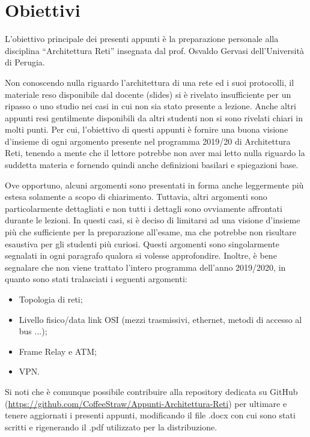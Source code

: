 
\section*{Obiettivi}
    L’obiettivo principale dei presenti appunti è la preparazione personale alla disciplina
    “Architettura Reti” insegnata dal prof. Osvaldo Gervasi dell’Università di Perugia.\newline

    Non conoscendo nulla riguardo l’architettura di una rete ed i suoi protocolli, il materiale reso
    disponibile dal docente (slides) si è rivelato insufficiente per un ripasso o uno studio nei casi in
    cui non sia stato presente a lezione. Anche altri appunti resi gentilmente disponibili da altri
    studenti non si sono rivelati chiari in molti punti.\newline\newline
    Per cui, l’obiettivo di questi appunti è fornire una buona visione d’insieme di ogni argomento
    presente nel programma 2019/20 di Architettura Reti, tenendo a mente che il lettore potrebbe
    non aver mai letto nulla riguardo la suddetta materia e fornendo quindi anche definizioni
    basilari e spiegazioni base.\newline

    Ove opportuno, alcuni argomenti sono presentati in forma anche leggermente più estesa
    solamente a scopo di chiarimento. Tuttavia, altri argomenti sono particolarmente dettagliati e
    non tutti i dettagli sono ovviamente affrontati durante le lezioni. In questi casi, si è deciso di
    limitarsi ad una visione d’insieme più che sufficiente per la preparazione all’esame, ma che
    potrebbe non risultare esaustiva per gli studenti più curiosi. Questi argomenti sono
    singolarmente segnalati in ogni paragrafo qualora si volesse approfondire.\newline\newline
    Inoltre, è bene segnalare che non viene trattato l’intero programma dell’anno 2019/2020, in
    quanto sono stati tralasciati i seguenti argomenti:
    
    \begin{itemize}
        \item Topologia di reti;
        \item Livello fisico/data link OSI (mezzi trasmissivi, ethernet, metodi di accesso al bus ...);
        \item Frame Relay e ATM;
        \item VPN.
    \end{itemize}

    Si noti che è comunque possibile contribuire alla repository dedicata su GitHub
    (\url{https://github.com/CoffeeStraw/Appunti-Architettura-Reti}) per ultimare e tenere aggiornati
    i presenti appunti, modificando il file .docx con cui sono stati scritti e rigenerando il .pdf
    utilizzato per la distribuzione.